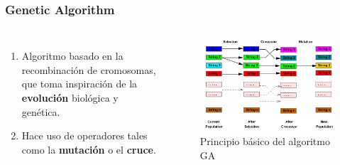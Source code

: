 \begin{frame}
  \frametitle{Genetic Algorithm}
  \begin{columns}
    \begin{enumerate}
      \item Algoritmo basado en la recombinación de cromosomas, que toma inspiración de la \textbf{evolución} biológica y genética.
      \item Hace uso de operadores tales como la \textbf{mutación} o el \textbf{cruce}.
    \end{enumerate}
    \begin{figure}
      \begin{center}
        \includegraphics[width=\textwidth]{imagenes/chapter3/ga-working-principle.png}
      \end{center}
      \caption{Principio básico del algoritmo GA \footnotemark[7]}
    \end{figure}
  \end{columns}
\end{frame}


